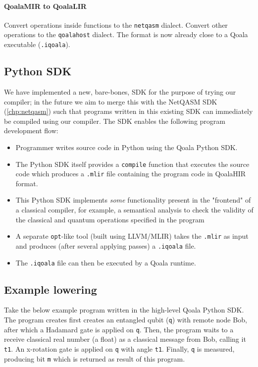 \paragraph{QoalaMIR to QoalaLIR}
Convert operations inside functions to the \texttt{netqasm} dialect.
Convert other operations to the \texttt{qoalahost} dialect.
The format is now already close to a Qoala executable (\texttt{.iqoala}).

\subsection{Python SDK}
We have implemented a new, bare-bones, SDK for the purpose of trying our compiler; in the future we aim to merge this with the NetQASM SDK (\cref{chp:netqasm}) such that programs written in this existing SDK can immediately be compiled using our compiler.
The SDK enables the following program development flow:

\begin{itemize}
\item Programmer writes source code in Python using the Qoala Python SDK.
\item The Python SDK itself provides a \texttt{compile} function that executes the source code
  which produces a \texttt{.mlir} file containing the program code in QoalaHIR format.
\item This Python SDK implements \textit{some} functionality present in the "frontend" of a classical
  compiler, for example, a semantical analysis to check the validity of the classical and
  quantum operations specified in the program 
\item A separate \texttt{opt}-like tool (built using LLVM/MLIR) takes the \texttt{.mlir} as input and produces
  (after several applying passes) a \texttt{.iqoala} file.
\item The \texttt{.iqoala} file can then be executed by a Qoala runtime.
\end{itemize}


\subsection{Example lowering}

Take the below example program written in the high-level Qoala Python SDK.
The program creates first creates an entangled qubit (\texttt{q}) with remote node Bob, after which a Hadamard gate is applied on \texttt{q}.
Then, the program waits to a receive classical real number (a float) as a classical message from Bob, calling it \texttt{t1}.
An x-rotation gate is applied on \texttt{q} with angle \texttt{t1}.
Finally, \texttt{q} is measured, producing bit \texttt{m} which is returned as result of this program.

